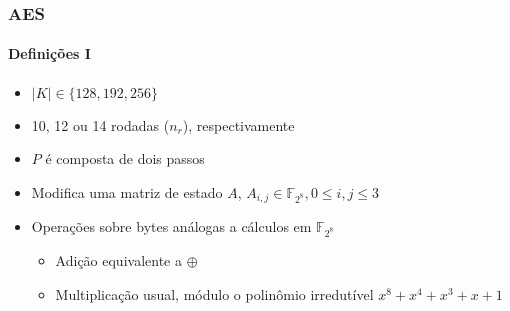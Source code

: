 \documentclass[12pt]{beamer}
\newcommand{\length}[1]{\vert #1 \vert}
\begin{document}
\begin{frame}
    \frametitle{AES}
    \framesubtitle{Definições I}
        \begin{itemize}
            \item $\length{K} \in \{128, 192, 256\}$
            \item 10, 12 ou 14 rodadas ($n_r$), respectivamente
            \item $P$ é composta de dois passos
        \end{itemize}
         \begin{itemize}
        \item Modifica uma matriz de estado $A$, $A_{i,j} \in \mathbb{F}_{2^8}, 0 \leq i, j \leq 3$
        \item Operações sobre bytes análogas a cálculos em $\mathbb{F}_{2^8}$
        \begin{itemize}
            \item Adição equivalente a $\oplus$
            \item Multiplicação usual, módulo o polinômio irredutível $x^8 + x^4 + x^3 + x + 1$
        \end{itemize}
    \end{itemize}
\end{frame}
\end{document}
